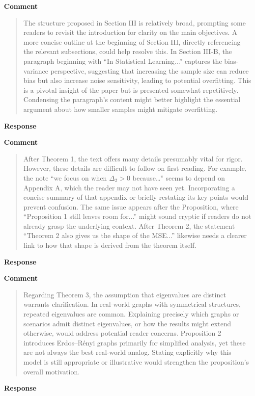 \documentclass[11pt,onecolumn,journal]{IEEEtran}
\begin{document}
\textbf{Comment}
\begin{quote}
The structure proposed in Section III is relatively broad, prompting some readers to revisit the introduction for clarity on the main objectives. A more concise outline at the beginning of Section III, directly referencing the relevant subsections, could help resolve this. In Section III-B, the paragraph beginning with “In Statistical Learning...” captures the bias-variance perspective, suggesting that increasing the sample size can reduce bias but also increase noise sensitivity, leading to potential overfitting. This is a pivotal insight of the paper but is presented somewhat repetitively. Condensing the paragraph’s content might better highlight the essential argument about how smaller samples might mitigate overfitting.

\end{quote}
\textbf{Response}


\textbf{Comment}
\begin{quote}
After Theorem 1, the text offers many details presumably vital for rigor. However, these details are difficult to follow on first reading. For example, the note “we focus on when $\Delta_2>0$ because…” seems to depend on Appendix A, which the reader may not have seen yet. Incorporating a concise summary of that appendix or briefly restating its key points would prevent confusion. The same issue appears after the Proposition, where “Proposition 1 still leaves room for...” might sound cryptic if readers do not already grasp the underlying context. After Theorem 2, the statement “Theorem 2 also gives us the shape of the MSE...” likewise needs a clearer link to how that shape is derived from the theorem itself.

\end{quote}
\textbf{Response}


\textbf{Comment}
\begin{quote}
Regarding Theorem 3, the assumption that eigenvalues are distinct warrants clarification. In real-world graphs with symmetrical structures, repeated eigenvalues are common. Explaining precisely which graphs or scenarios admit distinct eigenvalues, or how the results might extend otherwise, would address potential reader concerns. Proposition 2 introduces Erdos–Rényi graphs primarily for simplified analysis, yet these are not always the best real-world analog. Stating explicitly why this model is still appropriate or illustrative would strengthen the proposition’s overall motivation.

\end{quote}
\textbf{Response}
\end{document}
